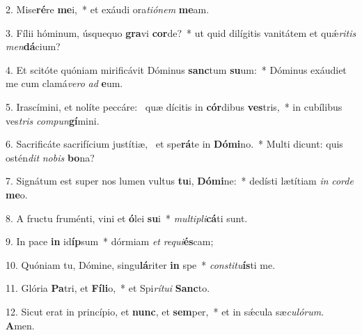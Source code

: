 2. Mise\textbf{ré}re \textbf{me}i,~*  et exáudi ora\textit{ti}\textit{ó}\textit{nem} \textbf{me}am.\

3. Fílii hóminum, úsquequo \textbf{gra}vi \textbf{cor}de?~*  ut quid dilígitis vanitátem et quǽ\textit{ri}\textit{tis} \textit{men}\textbf{dá}cium?\

4. Et scitóte quóniam mirificávit Dóminus \textbf{sanc}tum \textbf{su}um:~*  Dóminus exáudiet me cum clamá\textit{ve}\textit{ro} \textit{ad} \textbf{e}um.\

5. Irascímini, et nolíte peccáre: \dag\  quæ dícitis in \textbf{cór}dibus \textbf{ves}tris,~*  in cubílibus ves\textit{tris} \textit{com}\textit{pun}\textbf{gí}mini.\

6. Sacrificáte sacrifícium justítiæ, \dag\  et spe\textbf{rá}te in \textbf{Dó}\textbf{mi}no.~*  Multi dicunt: quis ostén\textit{dit} \textit{no}\textit{bis} \textbf{bo}na?\

7. Signátum est super nos lumen vultus \textbf{tu}i, \textbf{Dó}\textbf{mi}ne:~*  dedísti lætítiam \textit{in} \textit{cor}\textit{de} \textbf{me}o.\

8. A fructu fruménti, vini et \textbf{ó}lei \textbf{su}i~*  \textit{mul}\textit{ti}\textit{pli}\textbf{cá}ti sunt.\

9. In pace \textbf{in} id\textbf{íp}sum~*  dórmiam \textit{et} \textit{re}\textit{qui}\textbf{és}cam;\

10. Quóniam tu, Dómine, singu\textbf{lá}riter \textbf{in} spe~*  \textit{con}\textit{sti}\textit{tu}\textbf{ís}ti me.\

11. Glória \textbf{Pa}tri, et \textbf{Fí}\textbf{li}o,~*  et Spi\textit{rí}\textit{tu}\textit{i} \textbf{Sanc}to.\

12. Sicut erat in princípio, et \textbf{nunc}, et \textbf{sem}per,~*  et in sǽcula sæ\textit{cu}\textit{ló}\textit{rum}. \textbf{A}men.\

